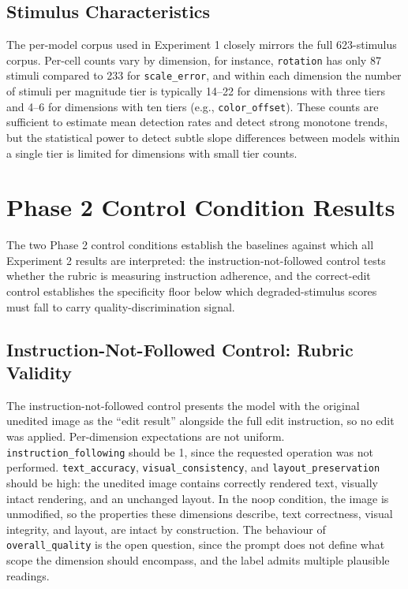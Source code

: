\subsection{Stimulus Characteristics}

The per-model corpus used in Experiment 1 closely mirrors the full 623-stimulus corpus. Per-cell counts vary by dimension, for instance, \texttt{rotation} has only 87 stimuli compared to 233 for \texttt{scale\_error}, and within each dimension the number of stimuli per magnitude tier is typically 14--22 for dimensions with three tiers and 4--6 for dimensions with ten tiers (e.g., \texttt{color\_offset}). These counts are sufficient to estimate mean detection rates and detect strong monotone trends, but the statistical power to detect subtle slope differences between models within a single tier is limited for dimensions with small tier counts.


\section{Phase 2 Control Condition Results} \label{sec:control-conditions}

The two Phase 2 control conditions establish the baselines against which all Experiment 2 results are interpreted: the instruction-not-followed control tests whether the rubric is measuring instruction adherence, and the correct-edit control establishes the specificity floor below which degraded-stimulus scores must fall to carry quality-discrimination signal.

\subsection{Instruction-Not-Followed Control: Rubric Validity} \label{sec:noop-control}

The instruction-not-followed control presents the model with the original unedited image as the ``edit result'' alongside the full edit instruction, so no edit was applied. Per-dimension expectations are not uniform. \texttt{instruction\_following} should be 1, since the requested operation was not performed. \texttt{text\_accuracy}, \texttt{visual\_consistency}, and \texttt{layout\_preservation} should be high: the unedited image contains correctly rendered text, visually intact rendering, and an unchanged layout. In the noop condition, the image is unmodified, so the properties these dimensions describe, text correctness, visual integrity, and layout, are intact by construction. The behaviour of \texttt{overall\_quality} is the open question, since the prompt does not define what scope the dimension should encompass, and the label admits multiple plausible readings.

